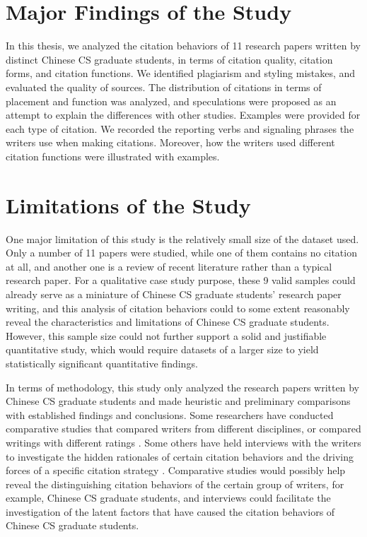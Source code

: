 \label{chap:conclusion}

\section{Major Findings of the Study}
In this thesis, we analyzed the citation behaviors of 11 research papers written by distinct Chinese CS graduate students, in terms of citation quality, citation forms, and citation functions. We identified plagiarism and styling mistakes, and evaluated the quality of sources. The distribution of citations in terms of placement and function was analyzed, and speculations were proposed as an attempt to explain the differences with other studies. Examples were provided for each type of citation. We recorded the reporting verbs and signaling phrases the writers use when making citations. Moreover, how the writers used different citation functions were illustrated with examples.

\section{Limitations of the Study}
\label{sec:limitations}

One major limitation of this study is the relatively small size of the dataset used. Only a number of 11 papers were studied, while one of them contains no citation at all, and another one is a review of recent literature rather than a typical research paper. For a qualitative case study purpose, these 9 valid samples could already serve as a miniature of Chinese CS graduate students’ research paper writing, and this analysis of citation behaviors could to some extent reasonably reveal the characteristics and limitations of Chinese CS graduate students. However, this sample size could not further support a solid and justifiable quantitative study, which would require datasets of a larger size to yield statistically significant quantitative findings.

In terms of methodology, this study only analyzed the research papers written by Chinese CS graduate students and made heuristic and preliminary comparisons with established findings and conclusions. Some researchers have conducted comparative studies that compared writers from different disciplines, or compared writings with different ratings \citep{hu_disciplinary_2014,hyland_authority_2002,mansourizadeh_citation_2011,petric_rhetorical_2007,samraj_form_2013}. Some others have held interviews with the writers to investigate the hidden rationales of certain citation behaviors and the driving forces of a specific citation strategy \citep{fazel_citation_2015,harwood_interview-based_2009,wette_source_2017}. Comparative studies would possibly help reveal the distinguishing citation behaviors of the certain group of writers, for example, Chinese CS graduate students, and interviews could facilitate the investigation of the latent factors that have caused the citation behaviors of Chinese CS graduate students.

